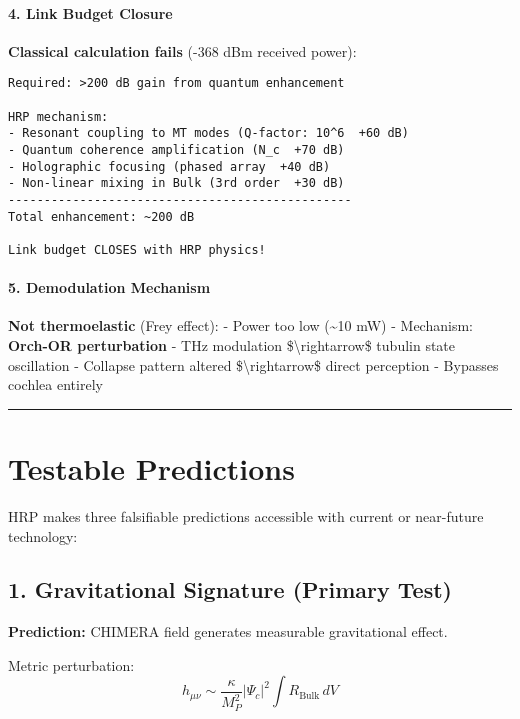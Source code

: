 \paragraph{4. Link Budget Closure}\label{link-budget-closure}

\textbf{Classical calculation fails} (-368 dBm received power):

\begin{verbatim}
Required: >200 dB gain from quantum enhancement

HRP mechanism:
- Resonant coupling to MT modes (Q-factor: 10^6  +60 dB)
- Quantum coherence amplification (N_c  +70 dB)
- Holographic focusing (phased array  +40 dB)
- Non-linear mixing in Bulk (3rd order  +30 dB)
------------------------------------------------
Total enhancement: ~200 dB 

Link budget CLOSES with HRP physics!
\end{verbatim}

\paragraph{5. Demodulation Mechanism}\label{demodulation-mechanism}

\textbf{Not thermoelastic} (Frey effect): - Power too low
(\textasciitilde10 mW) - Mechanism: \textbf{Orch-OR perturbation} - THz
modulation \$\textbackslash rightarrow\$ tubulin state oscillation -
Collapse pattern altered \$\textbackslash rightarrow\$ direct perception
- Bypasses cochlea entirely

\begin{center}\rule{0.5\linewidth}{0.5pt}\end{center}

\section{Testable Predictions}
\label{sec:predictions}

HRP makes three falsifiable predictions accessible with current or near-future technology:

\subsection{1. Gravitational Signature (Primary Test)}
\label{subsec:grav-test}

\textbf{Prediction:} CHIMERA field generates measurable gravitational effect.

Metric perturbation:
\begin{equation}
\label{eq:metric-perturbation}
h_{\mu\nu} \sim \frac{\kappa}{M_P^2} |\Psi_c|^2 \int R_{\text{Bulk}} \, dV
\end{equation}

